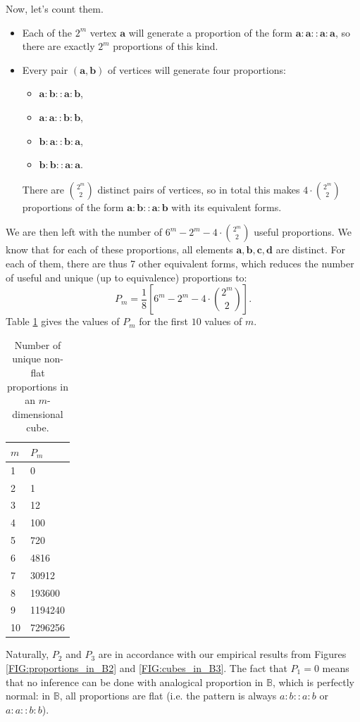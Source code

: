 Now, let's count them.

\begin{itemize}
  \item Each of the $2^m$ vertex $\mathbf{a}$ will generate a proportion of the
    form $\mathbf{a}: \mathbf{a} :: \mathbf{a} : \mathbf{a}$, so there are
    exactly $2^m$ proportions of this kind.
  \item Every pair $(\mathbf{a}, \mathbf{b})$ of vertices will generate four
    proportions:
    \begin{itemize}
      \item $\mathbf{a}: \mathbf{b} :: \mathbf{a} : \mathbf{b}$,
      \item $\mathbf{a}: \mathbf{a} :: \mathbf{b} : \mathbf{b}$,
      \item $\mathbf{b}: \mathbf{a} :: \mathbf{b} : \mathbf{a}$,
      \item $\mathbf{b}: \mathbf{b} :: \mathbf{a} : \mathbf{a}$.
    \end{itemize}
    There are $\binom{2^m}{2}$ distinct pairs of vertices, so in total this
    makes $4\cdot \binom{2^m}{2}$ proportions of the form $\mathbf{a}: \mathbf{b} ::
    \mathbf{a} : \mathbf{b}$ with its equivalent forms.
\end{itemize}

We are then left with the number of $6^m - 2^m - 4\cdot\binom{2^m}{2}$ useful
proportions. We know that for each of these proportions, all elements
$\mathbf{a}, \mathbf{b}, \mathbf{c}, \mathbf{d}$  are distinct. For each of
them, there are thus 7 other equivalent forms, which reduces the number of
useful and unique (up to equivalence) proportions to:
$$P_m = \frac{1}{8} \left[6^m - 2^m - 4\cdot\binom{2^m}{2} \right].$$
Table \ref{TAB:n_params_in_cube} gives the values of $P_m$ for the first $10$
values of $m$.
\begin{table}[h!]
\centering
  \begin{tabular}{ l  l }
\toprule
 $m$ & $P_m$\\
\midrule
    1	&	0\\
    2 &	1\\
    3	&	12\\
    4	&	100\\
    5 &	720\\
    6 &	4816\\
    7 &	30912\\
    8 &	193600\\
    9 & 1194240\\
    10 & 7296256\\
\bottomrule
\end{tabular}
\caption{Number of unique non-flat proportions in an $m$-dimensional cube.}
\label{TAB:n_params_in_cube}
\end{table}
Naturally, $P_2$ and $P_3$ are in accordance with our empirical  results from
Figures \ref{FIG:proportions_in_B2} and \ref{FIG:cubes_in_B3}. The fact that
$P_1 = 0$ means that no inference can be done with analogical proportion in
$\mathbb{B}$, which is perfectly normal: in $\mathbb{B}$, all proportions are
flat (i.e. the pattern is always $a:b::a:b$ or $a:a::b:b$).

